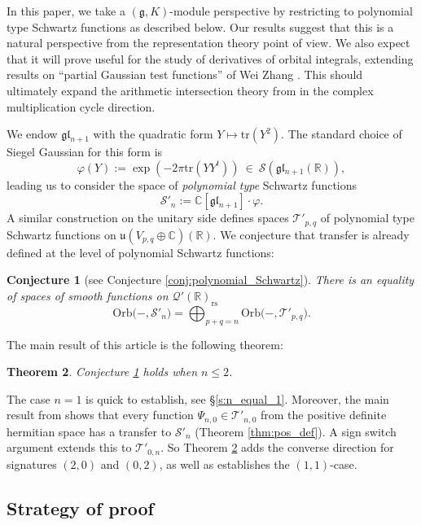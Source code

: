 \documentclass[reqno, 11pt]{amsart} %
\numberwithin{equation}{section}
\theoremstyle{plain}
\newtheorem{theorem}{Theorem}[section]
\newtheorem{conjecture}[theorem]{Conjecture}
\theoremstyle{definition}
\theoremstyle{remark}
\newcommand{\mr}{\mathrm}
\newcommand{\tr}{\mathrm{tr}}
\newcommand{\mbC}{\mathbb{C}}
\newcommand{\mbR}{\mathbb{R}}
\newcommand{\mcQ}{\mathcal{Q}}
\newcommand{\mcS}{\mathcal{S}}
\newcommand{\mcT}{\mathcal{T}}
\newcommand{\mfg}{\mathfrak{g}}
\newcommand{\mfl}{\mathfrak{l}}
\newcommand{\mfu}{\mathfrak{u}}
\newcommand{\rs}{\mr{rs}}
\newcommand{\mfgl}{\mfg\mfl}
\newcommand{\Orb}{\mathrm{Orb}}
\begin{document}
In this paper, we take a $(\mfg, K)$-module perspective by restricting to polynomial type Schwartz functions as described below. Our results suggest that this is a natural perspective from the representation theory point of view. We also expect that it will prove useful for the study of derivatives of orbital integrals, extending results on ``partial Gaussian test functions'' of Wei Zhang \cite{Zhang_AFL}. This should ultimately expand the arithmetic intersection theory from \cite{Zhang_AFL, MZ, ZZ, LMZ} in the complex multiplication cycle direction.

We endow $\mfgl_{n+1}$ with the quadratic form $Y\mapsto \tr(Y^2)$. The standard choice of Siegel Gaussian for this form is
$$φ(Y) := \exp(-2π\tr(YY^t)) \ \in \ \mcS(\mfgl_{n+1}(\mbR)),$$
leading us to consider the space of \emph{polynomial type} Schwartz functions
$$\mcS'_n := \mbC[\mfgl_{n+1}]\cdot φ.$$
A similar construction on the unitary side defines spaces $\mcT'_{p,q}$ of polynomial type Schwartz functions on $\mfu(V_{p,q}\oplus \mbC)(\mbR)$. We conjecture that transfer is already defined at the level of polynomial Schwartz functions:
\begin{conjecture}[see Conjecture \ref{conj:polynomial_Schwartz}]\label{conj:intro_transfer_poly_Schwartz}
There is an equality of spaces of smooth functions on $\mcQ'(\mbR)_\rs$
$$\Orb\big(-,\mcS'_n\big) = \bigoplus_{p + q = n} \Orb\big(-, \mcT'_{p,q}\big).$$
\end{conjecture}
The main result of this article is the following theorem:
\begin{theorem}\label{thm:intro_main}
Conjecture \ref{conj:intro_transfer_poly_Schwartz} holds when $n \leq 2$.
\end{theorem}
The case $n = 1$ is quick to establish, see \S\ref{s:n_equal_1}. Moreover, the main result from \cite{MSY} shows that every function $Ψ_{n,0}\in \mcT'_{n,0}$ from the positive definite hermitian space has a transfer to $\mcS'_n$ (Theorem \ref{thm:pos_def}). A sign switch argument extends this to $\mcT'_{0,n}$. So Theorem \ref{thm:intro_main} adds the converse direction for signatures $(2,0)$ and $(0,2)$, as well as establishes the $(1,1)$-case.

\subsection{Strategy of proof}
\end{document}
